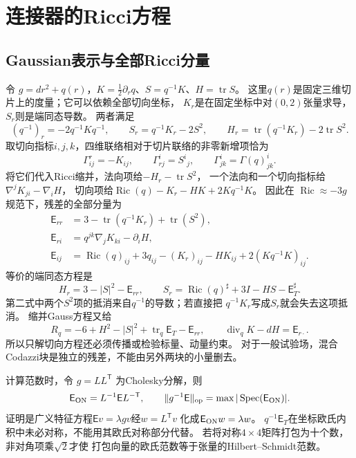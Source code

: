 \documentclass[UTF8,a4paper,11pt,fontset=fandol]{ctexart}
\numberwithin{equation}{section}
\theoremstyle{definition}
\newcommand{\Ric}{\operatorname{Ric}}
\newcommand{\tr}{\operatorname{tr}}
\newcommand{\spec}{\operatorname{Spec}}
\newcommand{\op}{\mathrm{op}}
\begin{document}
\section{连接器的Ricci方程}
\subsection{Gaussian表示与全部Ricci分量}
令 $g=dr^2+q(r)$，$K=\frac12\partial_rq$、$S=q^{-1}K$、$H=\tr S$。
这里$q(r)$是固定三维切片上的度量；它可以依赖全部切向坐标，
$K_r$是在固定坐标中对$(0,2)$张量求导，$S_r$则是端同态导数。
两者满足
\[
 (q^{-1})_r=-2q^{-1}Kq^{-1},\qquad
 S_r=q^{-1}K_r-2S^2,\qquad
 H_r=\tr(q^{-1}K_r)-2\tr S^2.
\]
取切向指标$i,j,k$，四维联络相对于切片联络的非零新增项恰为
\[
 \Gamma^r_{ij}=-K_{ij},\qquad
 \Gamma^i_{rj}=S^i{}_j,\qquad
 \Gamma^i_{jk}=\Gamma(q)^i_{jk}.
\]
将它们代入Ricci缩并，法向项给$-H_r-\tr S^2$，
一个法向和一个切向指标给$\nabla^jK_{ji}-\nabla_iH$，
切向项给$\Ric(q)-K_r-HK+2Kq^{-1}K$。
因此在 $\Ric\approx-3g$ 规范下，残差的全部分量为
\begin{align}
\mathsf E_{rr}&=3-\tr(q^{-1}K_r)+\tr(S^2),\\
\mathsf E_{ri}&=q^{jk}\nabla_jK_{ki}-\partial_iH,\\
\mathsf E_{ij}&=\Ric(q)_{ij}+3q_{ij}-(K_r)_{ij}-HK_{ij}
+2(Kq^{-1}K)_{ij}.\label{eq:fullRic}
\end{align}
等价的端同态方程是
\begin{equation}\label{eq:gaussian-evolution}
 H_r=3-|S|^2-\mathsf E_{rr},\qquad
 S_r=\Ric(q)^\sharp+3I-HS-\mathsf E_T^\sharp.
\end{equation}
第二式中两个$S^2$项的抵消来自$q^{-1}$的导数；若直接把
$q^{-1}K_r$写成$S_r$就会失去这项抵消。
缩并Gauss方程又给
\begin{equation}\label{eq:gaussian-constraint}
 R_q=-6+H^2-|S|^2+\tr_q\mathsf E_T-\mathsf E_{rr},
 \qquad \operatorname{div}_qK-dH=\mathsf E_{r\cdot}.
\end{equation}
所以只解切向方程还必须传播或检验标量、动量约束。
对于一般试验场，混合Codazzi块是独立的残差，不能由另外两块的小量删去。

计算范数时，令 $g=LL^{\mathsf T}$ 为Cholesky分解，则
\begin{equation}\label{eq:orthonormal-residual}
 \mathsf E_{\rm ON}=L^{-1}\mathsf E L^{-\mathsf T},\qquad
 \|g^{-1}\mathsf E\|_\op=\max|\spec(\mathsf E_{\rm ON})|.
\end{equation}
证明是广义特征方程$\mathsf E v=\lambda gv$经$w=L^{\mathsf T}v$
化成$\mathsf E_{\rm ON}w=\lambda w$。
$q^{-1}\mathsf E_T$在坐标欧氏内积中未必对称，不能用其欧氏对称部分代替。
若将对称$4\times4$矩阵打包为十个数，非对角项乘$\sqrt2$才使
打包向量的欧氏范数等于张量的Hilbert--Schmidt范数。
\end{document}
